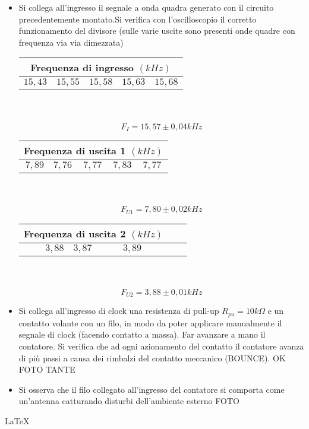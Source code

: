 \documentclass[a4paper]{article}
\begin{document}
\begin{itemize}

\item
Si collega all’ingresso il segnale a onda quadra generato con il circuito precedentemente montato.Si verifica con l’oscilloscopio il corretto funzionamento del divisore (sulle varie uscite sono presenti onde quadre con frequenza via via dimezzata)

\begin{center}
 \begin{tabular}{|r|l|l|l|l|}
     \hline
     \multicolumn{5}{|c|}{Frequenza di ingresso  \((kHz)\)} \\
     \hline
     \(15,43\) & \(15,55\) & \(15,58\) & \(15,63\) & \(15,68\) \\
     \hline
   \end{tabular} \\ \\

\[F_I=15,57 \pm 0,04 kHz\]

\begin{tabular}{|r|l|l|l|l|}
     \hline
     \multicolumn{5}{|c|}{Frequenza di uscita 1  \((kHz)\)} \\
     \hline
     \(7,89\) & \(7,76\) & \(7,77\) & \(7,83\) & \(7,77\) \\
     \hline
   \end{tabular} \\ \\

\[F_{U1}= 7,80 \pm 0,02 kHz\]

\begin{tabular}{|r|l|l|l|l|}
     \hline
     \multicolumn{3}{|c|}{Frequenza di uscita 2  \((kHz)\)} \\
     \hline
     \(3,88\) & \(3,87\) & \(3,89\)  \\
     \hline
   \end{tabular} \\ \\

\[F_{U2}= 3,88 \pm 0,01 kHz\]
\end{center}


\item Si collega all’ingresso di clock una resistenza di pull-up \(R_{pu}= 10 k\Omega\) e un contatto volante con un filo, in modo da poter applicare manualmente il segnale di clock (facendo contatto a massa). Far avanzare a mano il contatore. Si verifica che ad ogni azionamento del contatto il contatore avanza di più passi a causa dei rimbalzi del contatto meccanico (BOUNCE). OK FOTO TANTE

\item Si osserva che il filo collegato all'ingresso del contatore si comporta come un'antenna catturando disturbi dell'ambiente esterno FOTO
\end{itemize}

\LaTeX
\end{document}
